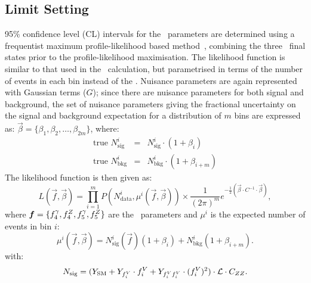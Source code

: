 \subsection{Limit Setting}

95\% confidence level (CL) intervals for the \TGC\ parameters are determined
using a frequentist maximum profile-likelihood based method~\cite{Cowan:2010js},
combining the three \lllplp\ final states prior to
the profile-likelihood maximisation. The likelihood function is similar
to that used in the \cx\ calculation, but parametrised in terms of the
number of events in each bin instead of the \cx.  Nuisance parameters are
again represented with Gaussian terms ($G$); since there are nuisance
parameters for both signal and background, the set of nuisance parameters giving
the fractional uncertainty on the signal and background expectation for a
distribution of $m$ bins are expressed as:
$\vec\beta = \{\beta_1, \beta_2, \ldots, \beta_{2m}\}$, where:
\begin{eqnarray}
\text{true }N_\mathrm{sig}^i &=& N_\mathrm{sig}^i \cdot (1 + \beta_i) \label{nuis1}\\
\text{true }N_\mathrm{bkg}^i &=& N_\mathrm{bkg}^i \cdot (1 + \beta_{i+m}) \label{nuis2}
\end{eqnarray}
The likelihood function is then given as:
\begin{equation}
L(\vec{f}, \vec{\beta}) =
\prod_{i=1}^{m}P(N_\mathrm{data}^i,\mu^i(\vec{f},\vec\beta))
\times
\frac{1}{(2\pi)^m}e^{-\frac{1}{2}\left(\vec\beta\cdot C^{-1}\cdot\vec\beta\right)},
\label{likelihood}
\end{equation}
where $\boldsymbol{f}=\{f_{4}^{\gamma}, f_{4}^{Z}, f_{5}^{\gamma}, f_{5}^{Z} \}$ are the \TGC\
parameters and $\mu^{i}$ is the expected number of events in bin $i$:
\begin{equation}
\mu^i(\vec{f},\vec{\beta})
= N_\mathrm{sig}^i(\vec{f})(1 + \beta_i) + N_\mathrm{bkg}^i(1 + \beta_{i+m}).
\end{equation}
with:
\begin{equation}
N_{\rm sig} = (Y_\mathrm{\rm SM} + Y_{f_i^V}\cdot f_i^V + Y_{f_i^Vf_i^V}\cdot (f_i^V)^2)\cdot\mathcal{L}\cdot{C_{ZZ}}.
\end{equation}

